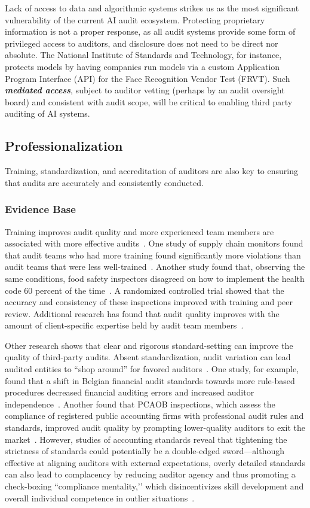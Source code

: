\documentclass[sigconf]{acmart}
\begin{document}
Lack of access to data and algorithmic systems strikes us as the most significant vulnerability of the current AI audit ecosystem. Protecting proprietary information is not a proper response, as all audit systems provide some form of privileged access to auditors, and disclosure does not need to be direct nor absolute. The National Institute of Standards and Technology, for instance, protects models by having companies run models via a custom Application Program Interface (API) for the Face Recognition Vendor Test (FRVT). Such \textbf{\textit{mediated access}}, subject to auditor vetting (perhaps by an audit oversight board) and consistent with audit scope, will be critical to enabling third party auditing of AI systems. 

\subsection{Professionalization} 
Training, standardization, and accreditation of auditors are also key to ensuring that audits are accurately and consistently conducted. 

\subsubsection{Evidence Base}
Training improves audit quality and more experienced team members are associated with more effective audits~\cite{aobdia2021economics}. One study of supply chain monitors found that audit teams who had more training found significantly more violations than audit teams that were less well-trained~\cite{short2016monitoring}. Another study found that, observing the same conditions, food safety inspectors disagreed on how to implement the health code 60 percent of the time~\cite{ho2017does}. A randomized controlled trial showed that the accuracy and consistency of these inspections improved with training and peer review. Additional research has found that audit quality improves with the amount of client-specific expertise held by audit team members~\cite{aobdia2021economics}.

Other research shows that clear and rigorous standard-setting can improve the quality of third-party audits. Absent standardization, audit variation can lead audited entities to “shop around” for favored auditors~\cite{chung2019opinion}. One study, for example, found that a shift in Belgian financial audit standards towards more rule-based procedures decreased financial auditing errors and increased auditor independence~\cite{carcello2009rules}. Another found that PCAOB inspections, which assess the compliance of registered public accounting firms with professional audit rules and standards, improved audit quality by prompting lower-quality auditors to exit the market~\cite{defond2011effect}. However, studies of accounting standards reveal that tightening the strictness of standards could potentially be a double-edged sword—although effective at aligning auditors with external expectations, overly detailed standards can also lead to complacency by reducing auditor agency and thus promoting a check-boxing “compliance mentality,’’ which disincentivizes skill development and overall individual competence in outlier situations~\cite{gao2019auditing}.
\end{document}
